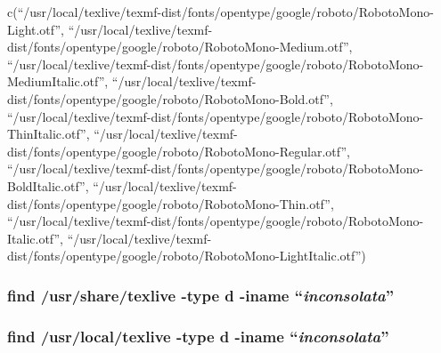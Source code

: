 \documentclass[
]{article}
\begin{document}
c(``/usr/local/texlive/texmf-dist/fonts/opentype/google/roboto/RobotoMono-Light.otf'',
``/usr/local/texlive/texmf-dist/fonts/opentype/google/roboto/RobotoMono-Medium.otf'',
``/usr/local/texlive/texmf-dist/fonts/opentype/google/roboto/RobotoMono-MediumItalic.otf'',
``/usr/local/texlive/texmf-dist/fonts/opentype/google/roboto/RobotoMono-Bold.otf'',
``/usr/local/texlive/texmf-dist/fonts/opentype/google/roboto/RobotoMono-ThinItalic.otf'',
``/usr/local/texlive/texmf-dist/fonts/opentype/google/roboto/RobotoMono-Regular.otf'',
``/usr/local/texlive/texmf-dist/fonts/opentype/google/roboto/RobotoMono-BoldItalic.otf'',
``/usr/local/texlive/texmf-dist/fonts/opentype/google/roboto/RobotoMono-Thin.otf'',
``/usr/local/texlive/texmf-dist/fonts/opentype/google/roboto/RobotoMono-Italic.otf'',
``/usr/local/texlive/texmf-dist/fonts/opentype/google/roboto/RobotoMono-LightItalic.otf'')

\hypertarget{find-usrsharetexlive--type-d--iname-inconsolata}{%
\subsubsection{\texorpdfstring{find /usr/share/texlive -type d -iname
``\emph{inconsolata}''}{find /usr/share/texlive -type d -iname ``inconsolata''}}\label{find-usrsharetexlive--type-d--iname-inconsolata}}

\hypertarget{find-usrlocaltexlive--type-d--iname-inconsolata}{%
\subsubsection{\texorpdfstring{find /usr/local/texlive -type d -iname
``\emph{inconsolata}''}{find /usr/local/texlive -type d -iname ``inconsolata''}}\label{find-usrlocaltexlive--type-d--iname-inconsolata}}
\end{document}
